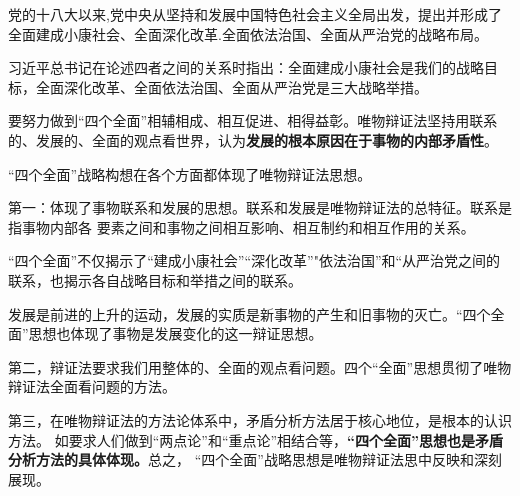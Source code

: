 {
党的十八大以来,党中央从坚持和发展中国特色社会主义全局出发，{提出并形成了全面建成小康社会、全面深化改革.全面依法治国、全面从严治党的战略布局。}}

{
习近平总书记在论述四者之间的关系时指出：{全面建成小康社会是我们的战略目标，全面深化改革、全面依法治国、全面从严治党是三大战略举措。}}

{要努力做到``四个全面''相辅相成、相互促进、相得益彰。唯物辩证法坚持用联系的、发展的、全面的观点看世界，认为\textbf{{发展的根本原因在于事物的内部矛盾性}}。}

{``四个全面''战略构想在各个方面都体现了唯物辩证法思想。}

{{第一：体现了事物联系和发展的思想。}联系和发展是唯物辩证法的总特征。联系是指事物内部各
要素之间和事物之间相互影响、相互制约和相互作用的关系。}

{``四个全面''不仅揭示了``建成小康社会''``深化改革''"依法治国''和``从严治党之间的联系，也揭示各自战略目标和举措之间的联系。}

{发展是前进的上升的运动，发展的实质是新事物的产生和旧事物的灭亡。``四个全面''思想也体现了事物是发展变化的这一辩证思想。}

{{第二，辩证法要求我们用整体的、全面的观点看问题。}四个``全面''思想贯彻了唯物辩证法全面看问题的方法。}

{{第三，在唯物辩证法的方法论体系中，矛盾分析方法居于核心地位，是根本的认识方法。}
如要求人们做到``两点论''和``重点论''相结合等，\textbf{``四个全面''思想也是矛盾分析方法的具体体现。}总之，
``四个全面''战略思想是唯物辩证法思中反映和深刻展现。}
